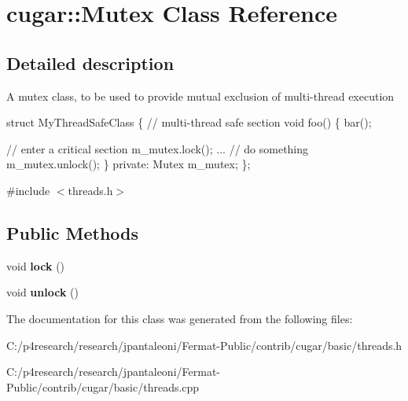\hypertarget{classcugar_1_1_mutex}{}\section{cugar\+:\+:Mutex Class Reference}
\label{classcugar_1_1_mutex}


\subsection{Detailed description}
A mutex class, to be used to provide mutual exclusion of multi-\/thread execution


\begin{DoxyCode}
\textcolor{keyword}{struct }MyThreadSafeClass
\{
    \textcolor{comment}{// multi-thread safe section}
    \textcolor{keywordtype}{void} foo()
    \{
       bar();

       \textcolor{comment}{// enter a critical section}
       m\_mutex.lock();
       ... \textcolor{comment}{// do something}
       m\_mutex.unlock();
    \}
\textcolor{keyword}{private}:
    Mutex m\_mutex;
\};
\end{DoxyCode}
 

{\ttfamily \#include $<$threads.\+h$>$}

\subsection*{Public Methods}
\begin{DoxyCompactItemize}
\item 
\mbox{\label{classcugar_1_1_mutex_ad9d468993b3d0c8a6271df7f609560fd}} 
void {\bfseries lock} ()
\item 
\mbox{\label{classcugar_1_1_mutex_a46a8e42f0f1c4985473a7b807d67067d}} 
void {\bfseries unlock} ()
\end{DoxyCompactItemize}


The documentation for this class was generated from the following files\+:\begin{DoxyCompactItemize}
\item 
C\+:/p4research/research/jpantaleoni/\+Fermat-\/\+Public/contrib/cugar/basic/threads.\+h\item 
C\+:/p4research/research/jpantaleoni/\+Fermat-\/\+Public/contrib/cugar/basic/threads.\+cpp\end{DoxyCompactItemize}
